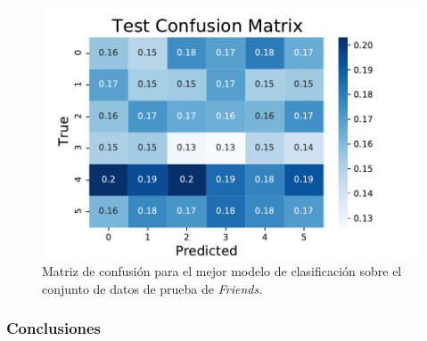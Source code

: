 \begin{figure}[H]
    \centering
    \includegraphics{doc/images/friends_test_confusion.pdf}
    \caption{Matriz de confusión para el mejor modelo de clasificación sobre el conjunto de datos de prueba de \textit{Friends}.}
    \label{fig:em_friends_confusion_test}
\end{figure}


\subsubsection{Conclusiones}